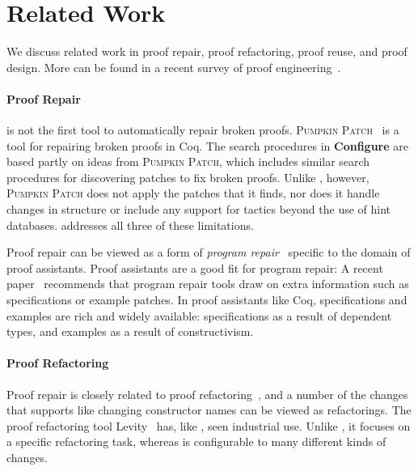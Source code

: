 \section{Related Work}


We discuss related work in proof repair, proof refactoring, proof reuse, and proof design.
More can be found in a recent survey of proof engineering~\cite{PGL-045}.

\paragraph{Proof Repair}

\toolname is not the first tool to automatically repair broken proofs.
\textsc{Pumpkin Patch}~\cite{pumpkinpatch} is a tool for repairing broken proofs in Coq.
The search procedures in \textbf{Configure} are based partly on ideas from \textsc{Pumpkin Patch}, which includes
similar search procedures for discovering patches to fix broken proofs.
Unlike \toolname, however, \textsc{Pumpkin Patch} does not apply the patches that it finds,
nor does it handle changes in structure or include any support for tactics beyond the use of hint databases.
\toolname addresses all three of these limitations.

Proof repair can be viewed as a form of \textit{program repair}~\cite{Monperrus:2018:ASR:3177787.3105906, Gazzola:2018:ASR:3180155.3182526}
specific to the domain of proof assistants.
Proof assistants are a good fit for program repair: A recent paper~\cite{Qi:2015:APP:2771783.2771791} 
recommends that program repair tools draw on extra information
such as specifications or example patches. In proof assistants like Coq, specifications and examples 
are rich and widely available: specifications as a result of dependent types,
and examples as a result of constructivism.

\paragraph{Proof Refactoring}

Proof repair is closely related to proof refactoring~\cite{WhitesidePhD}, and a number of the changes
that \toolname supports like changing constructor names can be viewed as refactorings.
The proof refactoring tool Levity~\cite{Bourke12} has, like \toolname, seen industrial use.
Unlike \toolname, it focuses on a specific refactoring task, whereas \toolname is configurable to many different kinds of changes.

